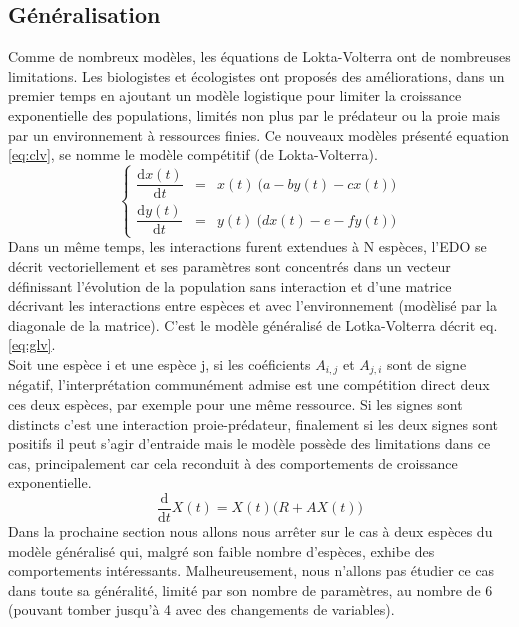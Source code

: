 \documentclass{wsdcr}
\begin{document}
\subsection{Généralisation}
Comme de nombreux modèles, les équations de Lokta-Volterra ont de nombreuses limitations. Les biologistes et écologistes ont  proposés des améliorations, dans un premier temps en ajoutant un modèle logistique pour limiter la croissance exponentielle des populations, limités non plus par le prédateur ou la proie mais par un environnement à ressources finies. Ce nouveaux modèles présenté equation \ref{eq:clv}, se nomme le modèle compétitif (de Lokta-Volterra).
\begin{equation}
\left\{
{\begin{array}{ccc}{\dfrac {\mathrm {d} x(t)}{\mathrm {d} t}}&=&x(t)\ {\Big (}a -b y(t)-c x(t){\Big )}\\{\dfrac {\mathrm {d} y(t)}{\mathrm {d} t}}&=&y(t)\ {\Big (}d x(t)-e -f y(t) {\Big )}\end{array}}
\right.
\label{eq:clv}
\end{equation}
Dans un même temps, les interactions furent extendues à N espèces, l'EDO se décrit vectoriellement et ses paramètres sont concentrés dans un vecteur définissant l'évolution de la population sans interaction et d'une matrice décrivant les interactions entre espèces et avec l'environnement (modèlisé par la diagonale de la matrice). C'est le modèle généralisé de Lotka-Volterra décrit eq.\ref{eq:glv}. \\
Soit une espèce i et une espèce j, si les coéficients $A_{i,j}$ et $A_{j,i}$ sont de signe négatif, l'interprétation communément admise est une compétition direct deux ces deux espèces, par exemple pour une même ressource. Si les signes sont distincts c'est une interaction proie-prédateur, finalement si les deux signes sont positifs il peut s'agir d'entraide mais le modèle possède des limitations dans ce cas, principalement car cela reconduit à des comportements de croissance exponentielle.
\begin{equation}
\dfrac {\mathrm {d}}{\mathrm {d} t}X(t)=X(t) {\Big (}R+AX(t){\Big )}
\label{eq:glv}
\end{equation}
Dans la prochaine section nous allons nous arrêter sur le cas à deux espèces du modèle généralisé qui, malgré son faible nombre d'espèces, exhibe des comportements intéressants. Malheureusement, nous n'allons pas étudier ce cas dans toute sa généralité, limité par son nombre de paramètres, au nombre de 6 (pouvant tomber jusqu'à 4 avec des changements de variables).
\end{document}

